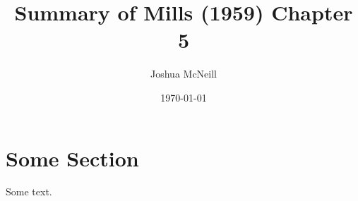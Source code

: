 \documentclass{article}
\title{Summary of Mills (1959) Chapter 5}
\author{Joshua McNeill}
\date{\today}
\begin{document}
  \maketitle
  \section{Some Section}
    Some text. \parencite{mills_sociological_2000}
\end{document}
